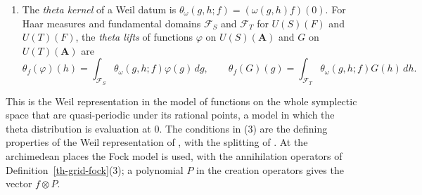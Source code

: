 \begin{definition}
\begin{enumerate}
  $\omega(g,h)$ preserves theta functions; on theta functions
  $\omega(g,h)\rho(w_0)=\rho(hw_0g^{-1})\omega(g,h)$;
  $(\omega(\gamma,\gamma')f)(0)=f(0)$ for $\gamma\in U(S)(F)$,
  $\gamma'\in U(T)(F)$ and theta functions $f$; $(g,h)\mapsto(\omega(g,h)f)(w)$
  is continuous; $\omega(g,h)$ preserves the $L^2$-norm of theta functions on a
  fundamental domain for $M_{\operatorname{rk}T\times\operatorname{rk}S}(E)$
  in $\mathbb W$; and at the places of $F$ split in $E$, $\omega(g,h)$ acts on
  linear functionals invariant under the corresponding half of $\mathbb W$
  through the scalar $r\,\chi_T(x)^{-1}\chi_S(y)$, with $r>0$ and $x,y$ the
  determinants of $g$ and $h$ there.
\item The \emph{theta kernel} of a Weil datum is
  $\theta_\omega(g,h;f)=(\omega(g,h)f)(0)$. For Haar measures and fundamental
  domains $\mathcal F_S$ and $\mathcal F_T$ for $U(S)(F)$ and $U(T)(F)$, the
  \emph{theta lifts} of functions $\varphi$ on $U(S)(\mathbf A)$ and $G$ on
  $U(T)(\mathbf A)$ are
  \[
  \theta_f(\varphi)(h)=\int_{\mathcal F_S}\theta_\omega(g,h;f)\varphi(g)\,dg,\qquad
  \theta_f(G)(g)=\int_{\mathcal F_T}\theta_\omega(g,h;f)G(h)\,dh.
  \]
\end{enumerate}
\end{definition}

This is the Weil representation in the model of functions on the whole
symplectic space that are quasi-periodic under its rational points, a model
in which the theta distribution is evaluation at $0$. The conditions in (3)
are the defining properties of the Weil representation of \cite{Wei64}, with
the splitting of \cite{Kud94}. At the archimedean places the Fock model is
used, with the annihilation operators of Definition~\ref{th-grid-fock}(3); a
polynomial $P$ in the creation operators gives the vector $f\otimes P$.

